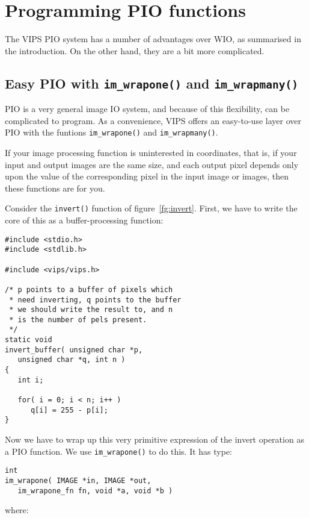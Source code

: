 \section{Programming PIO functions}
\label{sec:pio}

The VIPS PIO system has a number of advantages over WIO, as summarised in
the introduction. On the other hand, they are a bit more complicated.

\subsection{Easy PIO with \texttt{im\_wrapone()} and \texttt{im\_wrapmany()}}
\label{sec:wrapone}

PIO is a very general image IO system, and because of this flexibility,
can be complicated to program. As a convenience, VIPS offers an easy-to-use
layer over PIO with the funtions \verb+im_wrapone()+ and \verb+im_wrapmany()+.

If your image processing function is uninterested in coordinates, that is,
if your input and output images are the same size, and each output pixel
depends only upon the value of the corresponding pixel in the input image
or images, then these functions are for you.

Consider the \verb+invert()+ function of figure~\ref{fg:invert}. First,
we have to write the core of this as a buffer-processing function:

\begin{verbatim}
#include <stdio.h>
#include <stdlib.h>

#include <vips/vips.h>

/* p points to a buffer of pixels which 
 * need inverting, q points to the buffer 
 * we should write the result to, and n 
 * is the number of pels present.
 */
static void
invert_buffer( unsigned char *p, 
   unsigned char *q, int n )
{
   int i;

   for( i = 0; i < n; i++ )
      q[i] = 255 - p[i];
}
\end{verbatim}

Now we have to wrap up this very primitive expression of the invert operation
as a PIO function. We use \verb+im_wrapone()+ to do this. It has type:

\begin{verbatim}
int
im_wrapone( IMAGE *in, IMAGE *out,
   im_wrapone_fn fn, void *a, void *b )
\end{verbatim}

\noindent
where:

